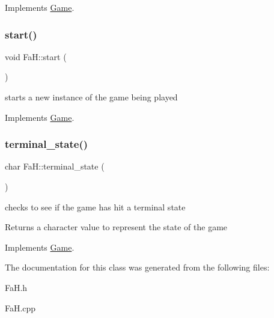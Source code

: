 Implements \hyperlink{class_game_a205fc7dd195bc398138cc188aad8bc38}{Game}.

\mbox{\label{class_fa_h_a21c22430a8fa6d3654cb29244d04d0ab}} 
\subsubsection{\texorpdfstring{start()}{start()}}
{\footnotesize\ttfamily void Fa\+H\+::start (\begin{DoxyParamCaption}{ }\end{DoxyParamCaption})\hspace{0.3cm}{\ttfamily [virtual]}}



starts a new instance of the game being played 



Implements \hyperlink{class_game_add988158041df85337995e36f06756aa}{Game}.

\mbox{\label{class_fa_h_a575223df37dc4b747634a7873e399275}} 
\subsubsection{\texorpdfstring{terminal\+\_\+state()}{terminal\_state()}}
{\footnotesize\ttfamily char Fa\+H\+::terminal\+\_\+state (\begin{DoxyParamCaption}{ }\end{DoxyParamCaption})\hspace{0.3cm}{\ttfamily [virtual]}}



checks to see if the game has hit a terminal state 

\begin{DoxyReturn}{Returns}
a character value to represent the state of the game 
\end{DoxyReturn}


Implements \hyperlink{class_game_ac7cbe36964272dd7dcd7e68fafaf24cc}{Game}.



The documentation for this class was generated from the following files\+:\begin{DoxyCompactItemize}
\item 
Fa\+H.\+h\item 
Fa\+H.\+cpp\end{DoxyCompactItemize}
